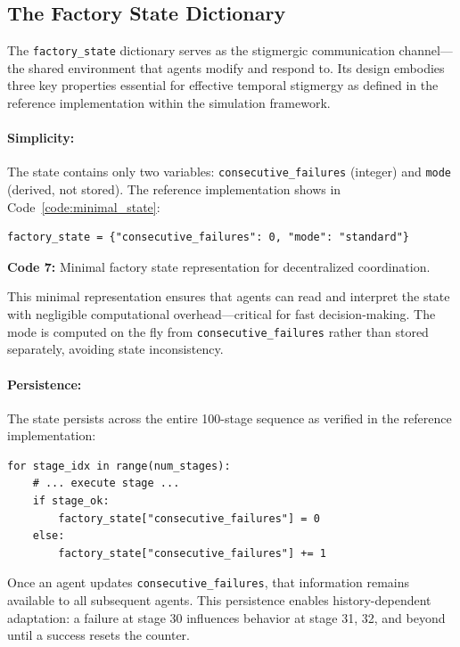 \documentclass[12pt,a4paper,oneside]{report}
\begin{document}
\subsection{The Factory State Dictionary}
\label{subsec:the_factory_state_dictionary}

The \texttt{factory\_state} dictionary serves as the stigmergic communication channel—the shared environment that agents modify and respond to. Its design embodies three key properties essential for effective temporal stigmergy as defined in the reference implementation within the simulation framework.

\paragraph{Simplicity:} The state contains only two variables: \texttt{consecutive\_failures} (integer) and \texttt{mode} (derived, not stored). The reference implementation shows in Code~\ref{code:minimal_state}:

\begin{verbatim}
factory_state = {"consecutive_failures": 0, "mode": "standard"}
\end{verbatim}
\vspace{0.2cm}
{\small \textbf{Code 7:} Minimal factory state representation for decentralized coordination.\label{code:minimal_state}}
\vspace{0.3cm}

This minimal representation ensures that agents can read and interpret the state with negligible computational overhead—critical for fast decision-making. The mode is computed on the fly from \texttt{consecutive\_failures} rather than stored separately, avoiding state inconsistency.

\paragraph{Persistence:} The state persists across the entire 100-stage sequence as verified in the reference implementation:

\begin{verbatim}
for stage_idx in range(num_stages):
    # ... execute stage ...
    if stage_ok:
        factory_state["consecutive_failures"] = 0
    else:
        factory_state["consecutive_failures"] += 1
\end{verbatim}

Once an agent updates \texttt{consecutive\_failures}, that information remains available to all subsequent agents. This persistence enables history-dependent adaptation: a failure at stage 30 influences behavior at stage 31, 32, and beyond until a success resets the counter.
\end{document}
